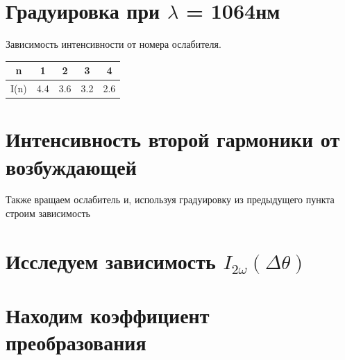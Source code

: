 \documentclass[a4paper,14pt]{article} %
\begin{document}
\section{Градуировка при $\lambda$ = 1064нм}
\begin{center}
Зависимость интенсивности от номера ослабителя.\\
\begin{table}[H]
\begin{tabular}{|c|c|c|c|c|}
\hline
n    & 1   & 2   & 3   & 4   \\ \hline
I(n) & 4.4 & 3.6 & 3.2 & 2.6 \\ \hline
\end{tabular}
\end{table}
\end{center}



\section{Интенсивность второй гармоники от возбуждающей}
Также вращаем ослабитель и, используя градуировку из предыдущего пункта строим зависимость

\section{Исследуем зависимость $I_{2\omega} (\Delta \theta)$}

\section{Находим коэффициент преобразования}
\end{document}
